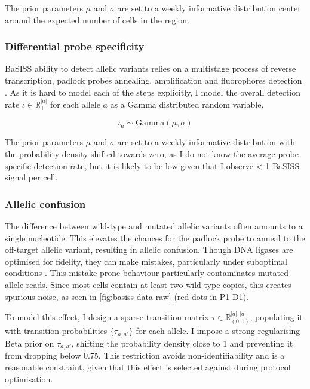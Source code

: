 The prior parameters $\mu$ and $\sigma$ are set to a weekly informative distribution center around the expected number of cells in the region.

\subsubsection*{Differential probe specificity}

\ac{BaSISS} ability to detect allelic variants relies on a multistage process of reverse transcription, padlock probes annealing, amplification and fluorophores detection \parencite{Svedlund2019-xb}. As it is hard to model each of the steps explicitly, I model the overall detection rate $\iota \in \mathbb{R}^{|a|}_{+}$ for each allele $a$ as a Gamma distributed random variable.

\begin{equation}
    {\iota}_{a} \sim \text{Gamma}(\mu, \sigma)
\end{equation}

The prior parameters $\mu$ and $\sigma$ are set to a weekly informative distribution with the probability density shifted towards zero, as I do not know the average probe specific detection rate, but it is likely to be low given that I observe < 1 \ac{BaSISS} signal per cell.

\subsubsection*{Allelic confusion}
\label{sec:allelic-confusion}


The difference between wild-type and mutated allelic variants often amounts to a single nucleotide. This elevates the chances for the padlock probe to anneal to the off-target allelic variant, resulting in allelic confusion. Though DNA ligases are optimised for fidelity, they can make mistakes, particularly under suboptimal conditions \parencite{Lohman2016-ec}. This mistake-prone behaviour particularly contaminates mutated allele reads. Since most cells contain at least two wild-type copies, this creates spurious noise, as seen in \cref{fig:basiss-data-raw} (red dots in P1-D1).

To model this effect, I design a sparse transition matrix ${\tau} \in \mathbb{R}^{|a|, |a|}_{(0,1)} $, populating it with transition probabilities $ \{ {\tau}_{a,a'}\} $ for each allele. I impose a strong regularising Beta prior on $ \tau_{a,a'} $, shifting the probability density close to 1 and preventing it from dropping below 0.75. This restriction avoids non-identifiability and is a reasonable constraint, given that this effect is selected against during protocol optimisation.

